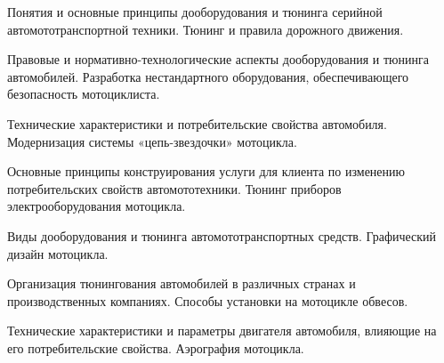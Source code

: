 \documentclass[
	14pt,
	a4paper,
	]
	{scrartcl}
\begin{document}
\shapk
{}
\setcounter{zad}{0}

\vfill
\z Понятия и основные принципы дооборудования и тюнинга серийной автомототранспортной техники.
 \vfill
\z Тюнинг и правила дорожного движения. \vfill

\vfill

\newpage


\shapk
{}
\setcounter{zad}{0}

\vfill
\z Правовые и нормативно-технологические аспекты дооборудования и тюнинга автомобилей.
 \vfill
\z Разработка нестандартного оборудования, обеспечивающего безопасность мотоциклиста.
 \vfill

\vfill

\newpage


\shapk
{}
\setcounter{zad}{0}

\vfill
\z Технические характеристики и потребительские свойства автомобиля.
 \vfill
\z Модернизация системы «цепь-звездочки» мотоцикла.
 \vfill

\vfill

\newpage


\shapk
{}
\setcounter{zad}{0}

\vfill
\z Основные принципы конструирования услуги для клиента по изменению потребительских свойств автомототехники.
 \vfill
\z Тюнинг приборов электрооборудования мотоцикла.
 \vfill

\vfill

\newpage


\shapk
{}
\setcounter{zad}{0}

\vfill
\z Виды дооборудования и тюнинга автомототранспортных средств.
 \vfill
\z Графический дизайн мотоцикла.
 \vfill

\vfill

\newpage


\shapk
{}
\setcounter{zad}{0}

\vfill
\z Организация тюнингования автомобилей в различных странах и производственных компаниях.
 \vfill
\z Способы установки на мотоцикле обвесов.
 \vfill

\vfill

\newpage


\shapk
{}
\setcounter{zad}{0}

\vfill
\z Технические характеристики и параметры двигателя автомобиля, влияющие на его потребительские свойства.
 \vfill
\z Аэрография мотоцикла.
 \vfill
\end{document}

